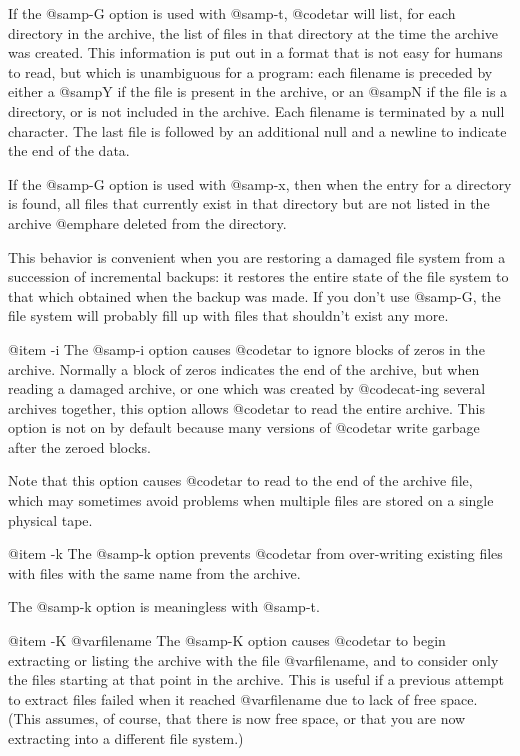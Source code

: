 If the @samp{-G} option is used with @samp{-t}, @code{tar} will list,
for each directory in the archive, the list of files in that
directory at the time the archive was created.  This information is
put out in a format that is not easy for humans to read, but which
is unambiguous for a program: each filename is preceded by either a
@samp{Y} if the file is present in the archive, or an @samp{N} if the
file is a directory, or is not included in the archive.  Each
filename is terminated by a null character.  The last file is
followed by an additional null and a newline to indicate the end of
the data.

If the @samp{-G} option is used with @samp{-x}, then when the entry
for a directory is found, all files that currently exist in that directory
but are not listed in the archive @emph{are deleted from the directory}.

This behavior is convenient when you are restoring a damaged file system
from a succession of incremental backups: it restores the entire state
of the file system to that which obtained when the backup was made.
If you don't use @samp{-G}, the file system will probably fill up
with files that shouldn't exist any more.

@item -i
The @samp{-i} option causes @code{tar} to ignore blocks of zeros in the
archive.  Normally a block of zeros indicates the end of the
archive, but when reading a damaged archive, or one which was created by
@code{cat}-ing several archives together, this option allows
@code{tar} to read the entire archive.  This option is not on by
default because many versions of @code{tar} write garbage after the
zeroed blocks.

Note that this option causes @code{tar} to read to the end of the
archive file, which may sometimes avoid problems when multiple files
are stored on a single physical tape.

@item -k
The @samp{-k} option prevents @code{tar} from over-writing existing
files with files with the same name from the archive.

The @samp{-k} option is meaningless with @samp{-t}.

@item -K @var{filename}
The @samp{-K} option causes @code{tar} to begin extracting or listing
the archive with the file @var{filename}, and to consider only the
files starting at that point in the archive.  This is useful if a
previous attempt to extract files failed when it reached
@var{filename} due to lack of free space.  (This assumes, of course,
that there is now free space, or that you are now extracting into a
different file system.)

